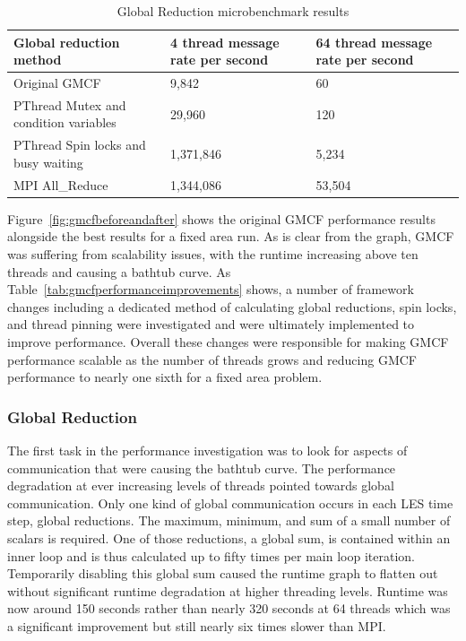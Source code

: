 \begin{table}[t]
    \centering
    \begin{tabular}{|l|l|l|}
        \hline
        Global reduction method &
        4 thread message rate per second &
        64 thread message rate per second\\
        \hline
        Original GMCF & 9,842 & 60\\
        \hline
        PThread Mutex and condition variables & 29,960 & 120\\
        \hline
        PThread Spin locks and busy waiting & 1,371,846 & 5,234\\
        \hline
        MPI All\_Reduce & 1,344,086 & 53,504\\
        \hline
    \end{tabular}
    \caption{Global Reduction microbenchmark results}
    \label{tab:gmcfglobalreductionresults}
\end{table}

Figure~\ref{fig:gmcfbeforeandafter} shows the original GMCF performance results
alongside the best results for a fixed area run. As is clear from the graph,
GMCF was suffering from scalability issues, with the runtime increasing above
ten threads and causing a bathtub curve. As
Table~\ref{tab:gmcfperformanceimprovements} shows, a number of framework changes
including a dedicated method of calculating global reductions, spin locks, and
thread pinning were investigated and were ultimately implemented to improve
performance. Overall these changes were responsible for making GMCF performance
scalable as the number of threads grows and reducing GMCF performance to nearly
one sixth for a fixed area problem.

\subsubsection{Global Reduction}

The first task in the performance investigation was to look for aspects of
communication that were causing the bathtub curve. The performance degradation
at ever increasing levels of threads pointed towards global communication. Only
one kind of global communication occurs in each LES time step, global
reductions. The maximum, minimum, and sum of a small number of scalars is
required. One of those reductions, a global sum, is contained within an inner
loop and is thus calculated up to fifty times per main loop iteration.
Temporarily disabling this global sum caused the runtime graph to flatten out
without significant runtime degradation at higher threading levels. Runtime was
now around 150 seconds rather than nearly 320 seconds at 64 threads which was a
significant improvement but still nearly six times slower than MPI.

